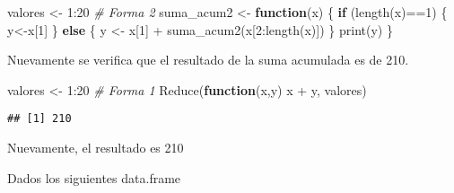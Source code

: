 \documentclass[
]{article}
\newenvironment{Shaded}{\begin{snugshade}}{\end{snugshade}}
\newcommand{\CommentTok}[1]{\textcolor[rgb]{0.56,0.35,0.01}{\textit{#1}}}
\newcommand{\ControlFlowTok}[1]{\textcolor[rgb]{0.13,0.29,0.53}{\textbf{#1}}}
\newcommand{\DecValTok}[1]{\textcolor[rgb]{0.00,0.00,0.81}{#1}}
\newcommand{\FunctionTok}[1]{\textcolor[rgb]{0.00,0.00,0.00}{#1}}
\newcommand{\NormalTok}[1]{#1}
\newcommand{\OtherTok}[1]{\textcolor[rgb]{0.56,0.35,0.01}{#1}}
\newcommand{\SpecialCharTok}[1]{\textcolor[rgb]{0.00,0.00,0.00}{#1}}
\begin{document}
\begin{Shaded}
\begin{Highlighting}[]
\NormalTok{valores }\OtherTok{\textless{}{-}} \DecValTok{1}\SpecialCharTok{:}\DecValTok{20}
\CommentTok{\# Forma 2}
\NormalTok{suma\_acum2 }\OtherTok{\textless{}{-}} \ControlFlowTok{function}\NormalTok{(x) \{}
  \ControlFlowTok{if}\NormalTok{ (}\FunctionTok{length}\NormalTok{(x)}\SpecialCharTok{==}\DecValTok{1}\NormalTok{) \{ }
\NormalTok{    y}\OtherTok{\textless{}{-}}\NormalTok{x[}\DecValTok{1}\NormalTok{]   \}}
  \ControlFlowTok{else}\NormalTok{ \{}
\NormalTok{    y }\OtherTok{\textless{}{-}}\NormalTok{ x[}\DecValTok{1}\NormalTok{] }\SpecialCharTok{+} \FunctionTok{suma\_acum2}\NormalTok{(x[}\DecValTok{2}\SpecialCharTok{:}\FunctionTok{length}\NormalTok{(x)]) }
\NormalTok{  \}}
  \FunctionTok{print}\NormalTok{(y)}
\NormalTok{\}}
\end{Highlighting}
\end{Shaded}

Nuevamente se verifica que el resultado de la suma acumulada es de 210.

\begin{Shaded}
\begin{Highlighting}[]
\NormalTok{valores }\OtherTok{\textless{}{-}} \DecValTok{1}\SpecialCharTok{:}\DecValTok{20}
\CommentTok{\# Forma 1}
\FunctionTok{Reduce}\NormalTok{(}\ControlFlowTok{function}\NormalTok{(x,y) x }\SpecialCharTok{+}\NormalTok{ y,  valores)}
\end{Highlighting}
\end{Shaded}

\begin{verbatim}
## [1] 210
\end{verbatim}

Nuevamente, el resultado es 210

Dados los siguientes data.frame
\end{document}
